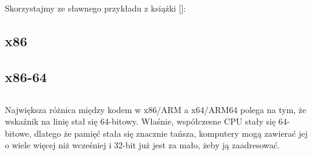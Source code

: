 \mysection{\HelloWorldSectionName}
\label{sec:helloworld}

Skorzystajmy ze sławnego przykładu z książki [\KRBook]:



\subsection{x86}





\subsection{x86-64}








\subsection{\Conclusion{}}

Największa różnica między kodem w x86/ARM a x64/ARM64 polega na tym, że wskaźnik na linię stał się 64-bitowy.
Właśnie, współczesne \ac{CPU} stały się 64-bitowe, dlatego że pamięć stała się znacznie tańsza,
komputery mogą zawierać jej o wiele więcej niż wcześniej i 32-bit już jest za mało, żeby ją zaadresować.




